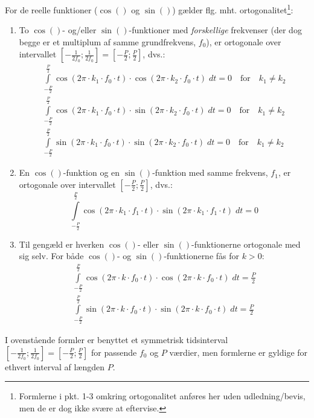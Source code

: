 \documentclass[11pt,a4paper]{article}
\begin{document}
\noindent{}For de reelle funktioner ($\cos()$ og $\sin()$) gælder flg. mht. ortogonalitet\footnote{Formlerne i pkt. 1-3 omkring ortogonalitet anføres her uden udledning/bevis, men de er dog ikke svære at eftervise.}:
\begin{enumerate}
	\item To $\cos()$- og/eller $\sin()$-funktioner med \emph{forskellige} frekvenser (der dog begge er et multiplum af samme grundfrekvens, $f_0$), er ortogonale over intervallet $\left[ -\frac{1}{2f_0} ; \frac{1}{2f_0} \right]=\left[ -\frac{P}{2} ; \frac{P}{2} \right]$, dvs.:
	\begin{gather} 
	\int\limits_{-\frac{P}{2}}^{\frac{P}{2}}\cos(2\pi\cdot{}k_{1}\cdot{}f_{0}\cdot{}t)\cdot{}\cos(2\pi\cdot{}k_{2}\cdot{}f_{0}\cdot{}t)\;dt = 0\quad{}\textrm{for}\quad{}k_{1}\ne{}k_{2}\\
	\int\limits_{-\frac{P}{2}}^{\frac{P}{2}}\cos(2\pi\cdot{}k_{1}\cdot{}f_{0}\cdot{}t)\cdot{}\sin(2\pi\cdot{}k_{2}\cdot{}f_{0}\cdot{}t)\;dt = 0\quad{}\textrm{for}\quad{}k_{1}\ne{}k_{2}\\
	\int\limits_{-\frac{P}{2}}^{\frac{P}{2}}\sin(2\pi\cdot{}k_{1}\cdot{}f_{0}\cdot{}t)\cdot{}\sin(2\pi\cdot{}k_{2}\cdot{}f_{0}\cdot{}t)\;dt = 0\quad{}\textrm{for}\quad{}k_{1}\ne{}k_{2}
	\end{gather}
	\item En $\cos()$-funktion og en $\sin()$-funktion med samme frekvens, $f_{1}$, er ortogonale over intervallet $\left[ -\frac{P}{2} ; \frac{P}{2} \right]$, dvs.:
	\begin{equation} 
	\int\limits_{-\frac{P}{2}}^{\frac{P}{2}}\cos(2\pi\cdot{}k_{1}\cdot{}f_{1}\cdot{}t)\cdot{}\sin(2\pi\cdot{}k_{1}\cdot{}f_{1}\cdot{}t)\;dt = 0
	\end{equation}
	\item Til gengæld er hverken $\cos()$- eller $\sin()$-funktionerne ortogonale med sig selv. For både $\cos()$- og $\sin()$-funktionerne fås for $k>0$:
	\begin{gather}
	\int\limits_{-\frac{P}{2}}^{\frac{P}{2}}\cos(2\pi\cdot{}k\cdot{}f_{0}\cdot{}t)\cdot{}\cos(2\pi\cdot{}k\cdot{}f_{0}\cdot{}t)\;dt = \frac{P}{2} \\
	\int\limits_{-\frac{P}{2}}^{\frac{P}{2}}\sin(2\pi\cdot{}k\cdot{}f_{0}\cdot{}t)\cdot{}\sin(2\pi\cdot{}k\cdot{}f_{0}\cdot{}t)\;dt = \frac{P}{2}
	\end{gather}
\end{enumerate}

I ovenstående formler er benyttet et symmetrisk tidsinterval $\left[ -\frac{1}{2f_{0}} ; \frac{1}{2f_{0}} \right] = \left[ -\frac{P}{2} ; \frac{P}{2} \right]$ for passende $f_{0}$ og $P$ værdier, men formlerne er gyldige for ethvert interval af længden $P$.
\end{document}
